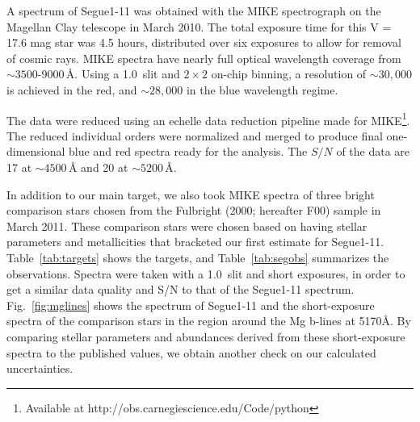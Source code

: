 \documentclass{emulateapj}
\begin{document}
A spectrum of Segue1-11 was obtained with the MIKE spectrograph \citep{mike}
on the Magellan Clay telescope in March 2010. The total exposure time for
this V = 17.6 mag star was 4.5 hours, distributed over six exposures to
 allow for removal of cosmic rays. MIKE spectra have
nearly full optical wavelength coverage from $\sim3500$-9000\,{\AA}. Using
a 1.0\arcsec\, slit and $2\times2$ on-chip binning, a resolution of
$\sim30,000$ is achieved in the red, and $\sim28,000$ in the blue
wavelength regime. 

The data were reduced using an echelle data reduction pipeline made for
MIKE\footnote{Available at http://obs.carnegiescience.edu/Code/python}.
The reduced individual orders were normalized and merged to produce
final one-dimensional blue and red spectra ready for the analysis. The
$S/N$ of the data are 17 at $\sim4500$\,{\AA} and 20 at $\sim5200$\,{\AA}.




In addition to our main target, we also took MIKE spectra of three bright comparison stars chosen from the Fulbright (2000; hereafter F00)\nocite{Fulbright2000} sample in March 2011. These comparison stars were chosen based on having stellar parameters and metallicities that bracketed our first estimate for Segue1-11. Table~\ref{tab:targets} shows the targets, and Table~\ref{tab:segobs} summarizes the observations.  Spectra were taken with a 1.0\arcsec\, slit and short exposures, in order to get a similar data quality and S/N to that of the Segue1-11 spectrum. Fig.~\ref{fig:mglines} shows the spectrum of Segue1-11 and the short-exposure spectra of the comparison stars in the region around the Mg b-lines at 5170\AA. By comparing stellar parameters and abundances derived from these short-exposure spectra to the published values, we obtain another check on our calculated uncertainties.
\end{document}
